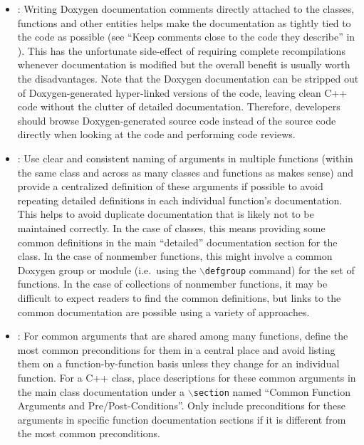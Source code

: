 \begin{itemize}

{}\item\DOXWriteInHeaders: Writing Doxygen documentation comments directly
attached to the classes, functions and other entities helps make the
documentation as tightly tied to the code as possible (see ``Keep comments
close to the code they describe'' in {}\cite[Section
32.5]{CodeComplete2nd04}).  This has the unfortunate side-effect of requiring
complete recompilations whenever documentation is modified but the overall
benefit is usually worth the disadvantages.  Note that the Doxygen
documentation can be stripped out of Doxygen-generated hyper-linked versions
of the code, leaving clean C++ code without the clutter of detailed
documentation.  Therefore, developers should browse Doxygen-generated source
code instead of the source code directly when looking at the code and
performing code reviews.

{}\item\DOXUseCentralizedDefintions: Use clear and consistent naming of
arguments in multiple functions (within the same class and across as many
classes and functions as makes sense) and provide a centralized definition of
these arguments if possible to avoid repeating detailed definitions in each
individual function's documentation.  This helps to avoid duplicate
documentation that is likely not to be maintained correctly.  In the case of
classes, this means providing some common definitions in the main ``detailed''
documentation section for the class.  In the case of nonmember functions, this
might involve a common Doxygen group or module (i.e.\ using the
{}\texttt{$\backslash$defgroup} command) for the set of functions.  In the
case of collections of nonmember functions, it may be difficult to expect
readers to find the common definitions, but links to the common documentation
are possible using a variety of approaches.

{}\item\DOXUseCentralizedPrePostConditions: For common arguments that are
shared among many functions, define the most common preconditions for them in
a central place and avoid listing them on a function-by-function basis unless
they change for an individual function.  For a C++ class, place descriptions
for these common arguments in the main class documentation under a
{}\texttt{$\backslash$section} named ``Common Function Arguments and
Pre/Post-Conditions''.  Only include preconditions for these arguments in
specific function documentation sections if it is different from the most
common preconditions.


\end{itemize}
